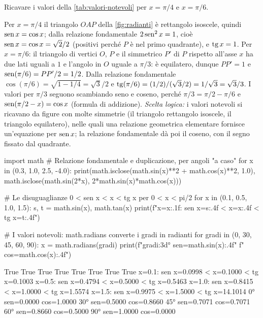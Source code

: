 \begin{esercizio}\label{es:valori-notevoli}
Ricavare i valori della \cref{tab:valori-notevoli} per $x=\pi/4$ e $x=\pi/6$.
\begin{soluzione}
Per $x=\pi/4$ il triangolo $OAP$ della \cref{fig:radianti} è rettangolo isoscele,
quindi $\operatorname{sen} x=\cos x$; dalla relazione fondamentale $2\operatorname{sen}^{2}x=1$, cioè
$\operatorname{sen} x=\cos x=\sqrt2/2$ (positivi perché $P$ è nel primo quadrante), e $\operatorname{tg} x=1$. Per
$x=\pi/6$: il triangolo di vertici $O$, $P$ e il simmetrico $P'$ di $P$ rispetto
all'asse $x$ ha due lati uguali a $1$ e l'angolo in $O$ uguale a $\pi/3$: è
equilatero, dunque $PP'=1$ e $\operatorname{sen}(\pi/6)=PP'/2=1/2$. Dalla relazione fondamentale
$\cos(\pi/6)=\sqrt{1-1/4}=\sqrt3/2$ e $\operatorname{tg}(\pi/6)=(1/2)/(\sqrt3/2)=1/\sqrt3=\sqrt3/3$.
I valori per $\pi/3$ seguono scambiando seno e coseno, perché $\pi/3=\pi/2-\pi/6$ e
$\operatorname{sen}(\pi/2-x)=\cos x$ (formula di addizione). \emph{Scelta logica:} i valori notevoli
si ricavano da figure con molte simmetrie (il triangolo rettangolo isoscele, il triangolo
equilatero), nelle quali una relazione geometrica elementare fornisce un'equazione per
$\operatorname{sen} x$; la relazione fondamentale dà poi il coseno, con il segno fissato dal quadrante.
\end{soluzione}
\end{esercizio}

\begin{python}
import math
# Relazione fondamentale e duplicazione, per angoli "a caso"
for x in (0.3, 1.0, 2.5, -4.0):
    print(math.isclose(math.sin(x)**2 + math.cos(x)**2, 1.0),
          math.isclose(math.sin(2*x), 2*math.sin(x)*math.cos(x)))

# Le disuguaglianze 0 < sen x < x < tg x per 0 < x < pi/2
for x in (0.1, 0.5, 1.0, 1.5):
    s, t = math.sin(x), math.tan(x)
    print(f"x={x:.1f}:  sen x={s:.4f} < x={x:.4f} < tg x={t:.4f}")

# I valori notevoli: math.radians converte i gradi in radianti
for gradi in (0, 30, 45, 60, 90):
    x = math.radians(gradi)
    print(f"{gradi:3d}°  sen={math.sin(x):.4f}"
          f"  cos={math.cos(x):.4f}")
\end{python}
\begin{risultato}
True True
True True
True True
True True
x=0.1:  sen x=0.0998 < x=0.1000 < tg x=0.1003
x=0.5:  sen x=0.4794 < x=0.5000 < tg x=0.5463
x=1.0:  sen x=0.8415 < x=1.0000 < tg x=1.5574
x=1.5:  sen x=0.9975 < x=1.5000 < tg x=14.1014
  0°  sen=0.0000  cos=1.0000
 30°  sen=0.5000  cos=0.8660
 45°  sen=0.7071  cos=0.7071
 60°  sen=0.8660  cos=0.5000
 90°  sen=1.0000  cos=0.0000
\end{risultato}

